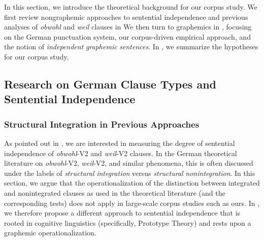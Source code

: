 In this section, we introduce the theoretical background for our corpus study. We first review nongraphemic approaches to sentential independence and previous analyses of \textit{obwohl} and \textit{weil} clauses in  We then turn to graphemics in , focusing on the German punctuation system, our corpus-driven empirical approach, and the notion of \textit{independent} \textit{graphemic} \textit{sentences}. In , we summarize the hypotheses for our corpus study.



\subsection{Research on German Clause Types and Sentential Independence}



\subsubsection{Structural Integration in Previous Approaches}



As pointed out in , we are interested in measuring the degree of sentential independence of \textit{obwohl}{}-V2 and \textit{weil}{}-V2 clauses. In the German theoretical literature on \textit{obwohl}{}-V2, \textit{weil}{}-V2, and similar phenomena, this is often discussed under the labels of \textit{structural} \textit{integration} versus \textit{structural} \textit{nonintegration}. In this section, we argue that the operationalization of the distinction between integrated and nonintegrated clauses as used in the theoretical literature (and the corresponding tests) does not apply in large-scale corpus studies such as ours. In , we therefore propose a different approach to sentential independence that is rooted in cognitive linguistics (specifically, Prototype Theory) and rests upon a graphemic operationalization.



